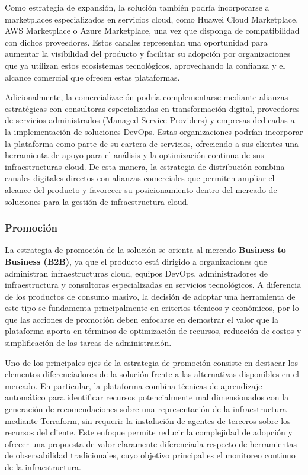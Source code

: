 Como estrategia de expansión, la solución también podría incorporarse a marketplaces especializados en servicios cloud, como Huawei Cloud Marketplace, AWS Marketplace o Azure Marketplace, una vez que disponga de compatibilidad con dichos proveedores. Estos canales representan una oportunidad para aumentar la visibilidad del producto y facilitar su adopción por organizaciones que ya utilizan estos ecosistemas tecnológicos, aprovechando la confianza y el alcance comercial que ofrecen estas plataformas.

Adicionalmente, la comercialización podría complementarse mediante alianzas estratégicas con consultoras especializadas en transformación digital, proveedores de servicios administrados (Managed Service Providers) y empresas dedicadas a la implementación de soluciones DevOps. Estas organizaciones podrían incorporar la plataforma como parte de su cartera de servicios, ofreciendo a sus clientes una herramienta de apoyo para el análisis y la optimización continua de sus infraestructuras cloud. De esta manera, la estrategia de distribución combina canales digitales directos con alianzas comerciales que permiten ampliar el alcance del producto y favorecer su posicionamiento dentro del mercado de soluciones para la gestión de infraestructura cloud.

\subsubsection{Promoción}

La estrategia de promoción de la solución se orienta al mercado \textbf{Business to Business (B2B)}, ya que el producto está dirigido a organizaciones que administran infraestructuras cloud, equipos DevOps, administradores de infraestructura y consultoras especializadas en servicios tecnológicos. A diferencia de los productos de consumo masivo, la decisión de adoptar una herramienta de este tipo se fundamenta principalmente en criterios técnicos y económicos, por lo que las acciones de promoción deben enfocarse en demostrar el valor que la plataforma aporta en términos de optimización de recursos, reducción de costos y simplificación de las tareas de administración.

Uno de los principales ejes de la estrategia de promoción consiste en destacar los elementos diferenciadores de la solución frente a las alternativas disponibles en el mercado. En particular, la plataforma combina técnicas de aprendizaje automático para identificar recursos potencialmente mal dimensionados con la generación de recomendaciones sobre una representación de la infraestructura mediante Terraform, sin requerir la instalación de agentes de terceros sobre los recursos del cliente. Este enfoque permite reducir la complejidad de adopción y ofrecer una propuesta de valor claramente diferenciada respecto de herramientas de observabilidad tradicionales, cuyo objetivo principal es el monitoreo continuo de la infraestructura.

